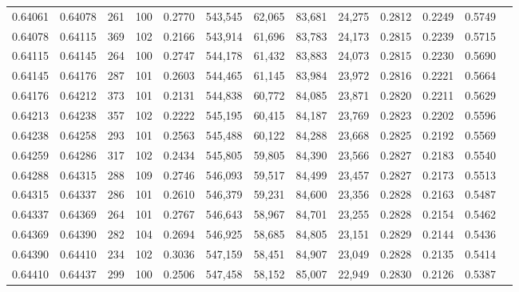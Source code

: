 \begin{tabular}{rrrrrrrrrrrrr}
0.64061 & 0.64078 &   261 & 100 &                                     0.2770 & 543,545 &  62,065 &  83,681 &  24,275 & 0.2812 & 0.2249 & 0.5749 \\
0.64078 & 0.64115 &   369 & 102 &                                     0.2166 & 543,914 &  61,696 &  83,783 &  24,173 & 0.2815 & 0.2239 & 0.5715 \\
0.64115 & 0.64145 &   264 & 100 &                                     0.2747 & 544,178 &  61,432 &  83,883 &  24,073 & 0.2815 & 0.2230 & 0.5690 \\
0.64145 & 0.64176 &   287 & 101 &                                     0.2603 & 544,465 &  61,145 &  83,984 &  23,972 & 0.2816 & 0.2221 & 0.5664 \\
0.64176 & 0.64212 &   373 & 101 &                                     0.2131 & 544,838 &  60,772 &  84,085 &  23,871 & 0.2820 & 0.2211 & 0.5629 \\
0.64213 & 0.64238 &   357 & 102 &                                     0.2222 & 545,195 &  60,415 &  84,187 &  23,769 & 0.2823 & 0.2202 & 0.5596 \\
0.64238 & 0.64258 &   293 & 101 &                                     0.2563 & 545,488 &  60,122 &  84,288 &  23,668 & 0.2825 & 0.2192 & 0.5569 \\
0.64259 & 0.64286 &   317 & 102 &                                     0.2434 & 545,805 &  59,805 &  84,390 &  23,566 & 0.2827 & 0.2183 & 0.5540 \\
0.64288 & 0.64315 &   288 & 109 &                                     0.2746 & 546,093 &  59,517 &  84,499 &  23,457 & 0.2827 & 0.2173 & 0.5513 \\
0.64315 & 0.64337 &   286 & 101 &                                     0.2610 & 546,379 &  59,231 &  84,600 &  23,356 & 0.2828 & 0.2163 & 0.5487 \\
0.64337 & 0.64369 &   264 & 101 &                                     0.2767 & 546,643 &  58,967 &  84,701 &  23,255 & 0.2828 & 0.2154 & 0.5462 \\
0.64369 & 0.64390 &   282 & 104 &                                     0.2694 & 546,925 &  58,685 &  84,805 &  23,151 & 0.2829 & 0.2144 & 0.5436 \\
0.64390 & 0.64410 &   234 & 102 &                                     0.3036 & 547,159 &  58,451 &  84,907 &  23,049 & 0.2828 & 0.2135 & 0.5414 \\
0.64410 & 0.64437 &   299 & 100 &                                     0.2506 & 547,458 &  58,152 &  85,007 &  22,949 & 0.2830 & 0.2126 & 0.5387 \\

\end{tabular}
